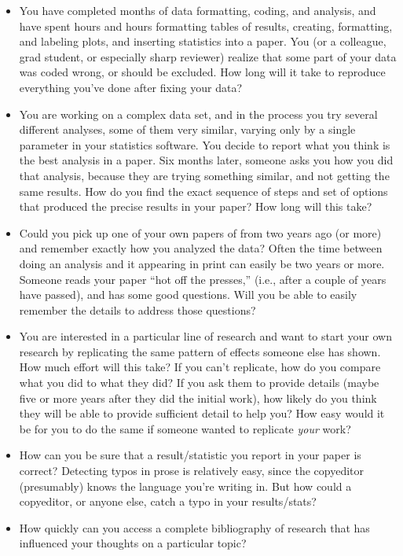 \documentclass{book}
\begin{document}
\begin{itemize}
\item You have completed months of data formatting, coding, and analysis, and have spent hours and hours formatting tables of results, creating, formatting, and labeling plots, and inserting statistics into a paper. You (or a colleague, grad student, or especially sharp reviewer) realize that some part of your data was coded wrong, or should be excluded.  How long will it take to reproduce everything you've done after fixing your data?
\item You are working on a complex data set, and in the process you try several different analyses, some of them very similar, varying only by a single parameter in your statistics software.  You decide to report what you think is the best analysis in a paper. Six months later, someone asks you how you did that analysis, because they are trying something similar, and not getting the same results. How do you find the exact sequence of steps and set of options that produced the precise results in your paper? How long will this take?
\item Could you pick up one of your own papers of from two years ago (or more) and remember exactly how you analyzed the data?  Often the time between doing an analysis and it appearing in print can easily be two years or more.  Someone reads your paper ``hot off the presses,'' (i.e., after a couple of years have passed), and has some good questions.  Will you be able to easily remember the details to address those questions?
\item You are interested in a particular line of research and want to start your own research by replicating the same pattern of effects someone else has shown. How much effort will this take? If you can't replicate, how do you compare what you did to what they did?  If you ask them to provide details (maybe five or more years after they did the initial work), how likely do you think they will be able to provide sufficient detail to help you?  How easy would it be for you to do the same if someone wanted to replicate \emph{your} work?
\item How can you be sure that a result/statistic you report in your paper is correct? Detecting typos in prose is relatively easy, since the copyeditor (presumably) knows the language you're writing in. But how could a copyeditor, or anyone else, catch a typo in your results/stats?
\item How quickly can you access a complete bibliography of research that has influenced your thoughts on a particular topic?

\end{itemize}
\end{document}
